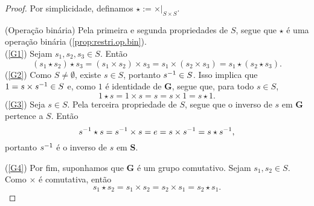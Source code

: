 \begin{proof}
Por simplicidade, definamos $\star := \times|_{S \times S}$.


(Operação binária) Pela primeira e segunda propriedades de $S$, segue que $\star$ é uma operação binária (\ref{prop:restri.op.bin}).\\
(\ref{G1}) Sejam $s_1,s_2,s_3 \in S$. Então
	\begin{equation*}
	(s_1 \star s_2) \star s_3 = (s_1 \times s_2) \times s_3 = s_1 \times (s_2 \times s_3) = s_1 \star (s_2 \star s_3).
	\end{equation*}
(\ref{G2}) Como $S \neq \emptyset$, existe $s \in S$, portanto $s^{-1} \in S$. Isso implica que $1=s \times s^{-1} \in S$ e, como $1$ é identidade de $\bm G$, segue que, para todo $s \in S$,
	\begin{equation*}
	1 \star s = 1 \times s = s = s \times 1 = s \star 1.
	\end{equation*}
(\ref{G3}) Seja $s \in S$. Pela terceira propriedade de $S$, segue que o inverso de $s$ em $\bm G$ pertence a $S$. Então
	\begin{equation*}
	s^{-1} \star s = s^{-1} \times s = e = s \times s^{-1} = s \star s^{-1},
	\end{equation*}
portanto $s^{-1}$ é o inverso de $s$ em $\bm S$.

(\ref{G4}) Por fim, suponhamos que $\bm G$ é um grupo comutativo. Sejam $s_1,s_2 \in S$. Como $\times$ é comutativa, então
	\begin{equation*}
	s_1 \star s_2 = s_1 \times s_2 = s_2 \times s_1 = s_2 \star s_1.
	\end{equation*}
\end{proof}

